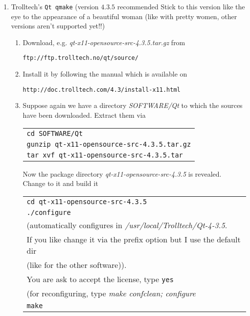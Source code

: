 \documentclass[a4paper,12pt]{article}
\begin{document}
\begin{enumerate}
\begin{enumerate}
    \item Trolltech's \texttt{Qt qmake} (version
    $4.3.5$ recommended \Stopsign Stick to this version like the eye to the
    appearance of a beautiful woman (like with pretty women, other versions aren't
    supported yet!!)
    \begin{enumerate}
      \item Download, e.g. \textit{qt-x11-opensource-src-4.3.5.tar.gz} from
       \begin{center} 
        \texttt{ftp://ftp.trolltech.no/qt/source/}
       \end{center}
    \item Install it by following the manual which is available on 
    \begin{center}
      \texttt{http://doc.trolltech.com/4.3/install-x11.html}
    \end{center}
   \newpage
   \item Suppose again we have a directory \textit{SOFTWARE/Qt} to which the
      sources have been downloaded. Extract them via
       \begin{center}
         \begin{tabular}{l} 
            \texttt{cd SOFTWARE/Qt}\\
           \texttt{gunzip qt-x11-opensource-src-4.3.5.tar.gz}\\ 
            \texttt{tar xvf qt-x11-opensource-src-4.3.5.tar}
         \end{tabular}
       \end{center}
        Now the package directory \textit{qt-x11-opensource-src-4.3.5} is
        revealed. Change to it and build it 
          \begin{center}
         \begin{tabular}{l} 
           \texttt{cd qt-x11-opensource-src-4.3.5}\\
           \texttt{./configure}\\
           (automatically configures in
           \textit{/usr/local/Trolltech/Qt-4-3.5}. \\If you like change it via
           the prefix option but I use the default dir \\(like for the other
           software)). \\You are ask to accept the license, type \texttt{yes} \\
           (for reconfiguring, type \textit{make confclean; configure}\\ 
           \texttt{make}\\

\end{tabular}
\end{center}
\end{enumerate}
\end{enumerate}
\end{enumerate}
\end{document}
